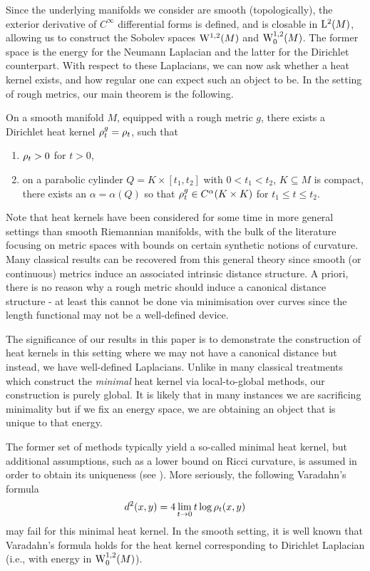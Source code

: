 \documentclass[a4paper, 12pt]{amsart}
\begin{document}
Since the underlying manifolds we consider are smooth (topologically), the exterior derivative of \(C^{\infty}\) differential forms is defined, and is closable in $\Lp{2}(M)$, allowing us to construct the Sobolev spaces $\SobH{1}(M)$
and $\SobH[0]{1}(M)$. The
former space is the  energy for the Neumann Laplacian
and the latter for the Dirichlet counterpart.
With respect to these Laplacians, we can now ask
whether a heat kernel exists, and how regular one
can expect such an object to be. In the setting of rough metrics, our main theorem
is the following. 

\begin{thm}
On a smooth manifold \(M\), equipped with a rough metric \(g\), there exists a 
Dirichlet heat kernel \(\hk_t^g = \hk_t\), such that
\begin{enumerate}
\item \(\hk_t > 0\) for \(t > 0\),
\item on a parabolic cylinder \(Q = K \times [t_1, t_2]\) with \(0 < t_1 < t_2\), \(K \subseteq M\) is compact, there exists an \(\alpha = \alpha(Q)\) so that \(\hk_t^g \in C^{\alpha}(K \times K)\) for \(t_1 \leq t \leq t_2\).
\end{enumerate}
\end{thm}


Note that heat kernels have been considered
for some time in more general settings than smooth Riemannian manifolds,
with the bulk of the literature focusing on metric spaces with bounds
on certain synthetic notions of curvature.
Many classical results can be recovered from this general 
theory since smooth (or continuous) metrics induce an associated intrinsic
distance structure. A priori, there is no reason
why a rough metric should induce a canonical distance structure - at least
this cannot be done via minimisation over curves since the
length functional may not be a well-defined device. 

The significance of our results in this paper is to demonstrate
the construction of heat kernels in this setting where we may 
not have a canonical distance but instead, we have well-defined Laplacians. 
Unlike in many classical treatments which construct the \emph{minimal} 
heat kernel via local-to-global methods, our construction is purely global.
It is likely that in many instances we are sacrificing minimality but if we fix
an energy space, we are obtaining an object that is unique to that energy.

The former set of methods typically yield a so-called minimal heat kernel,
but additional assumptions, such as a lower bound on Ricci curvature,
is assumed in order to obtain its uniqueness (see \cite{Chavel}).
More seriously, the following Varadahn's formula
$$ d^2(x,y) = 4 \lim_{t \to 0} t \log \hk_t(x,y)$$
may fail for this minimal heat kernel. In the smooth setting, it is well known that Varadahn's formula holds for the heat kernel corresponding to Dirichlet Laplacian (i.e., with energy in $\SobH[0]{1}(M)$).
\end{document}

